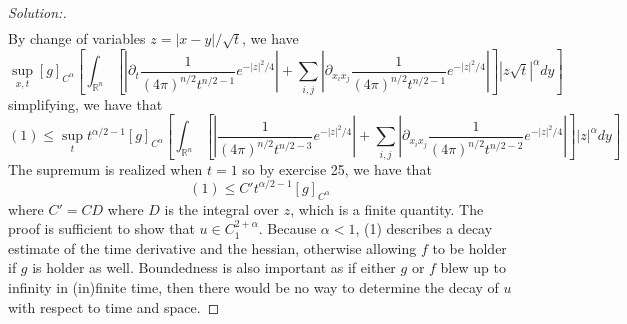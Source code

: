 \documentclass{article}
\newcommand{\R}{\mathbb{R}}
\begin{document}
\begin{proof}[Solution:]
\begin{align*}
        \end{align*}
        By change of variables $z = |x-y|/\sqrt{t}$, we have
        \[ \sup_{x,t}[g]_{C^\alpha}\left[\int_{\R^n} \left[|\partial_t \frac{1}{(4\pi)^{n/2}t^{n/2-1}}e^{-|z|^2/4}|+ \sum_{i,j}|\partial_{x_ix_j}\frac{1}{(4\pi)^{n/2}t^{n/2-1}}e^{-|z|^2/4}|\right]|z\sqrt{t}|^\alpha dy\right]\]
        simplifying, we have that 
        \[ (1)\le \sup_{t}t^{\alpha/2- 1}[g]_{C^\alpha}\left[\int_{\R^n} \left[|\frac{1}{(4\pi)^{n/2}t^{n/2-3}}e^{-|z|^2/4}|+ \sum_{i,j}|\partial_{x_ix_j}\frac{1}{(4\pi)^{n/2}t^{n/2-2}}e^{-|z|^2/4}|\right]|z|^\alpha dy\right]\]
        The supremum is realized when $t=1$ so by exercise 25, we have that 
        \[ (1)\le C't^{\alpha/2 - 1}[g]_{C^\alpha}\]
        where $C' = CD$ where $D$ is the integral over $z$, which is a finite quantity.\newline
        The proof is sufficient to show that $u\in C^{2+\alpha}_1$. Because $\alpha < 1$, (1) describes a decay estimate of the time derivative and the hessian, otherwise
        allowing $f$ to be holder if $g$ is holder as well. Boundedness is also important as if either $g$ or $f$ blew up to infinity in (in)finite time, then there would be no way to determine the decay of $u$ with respect to time and space.

      \end{proof}
    
\end{document}

